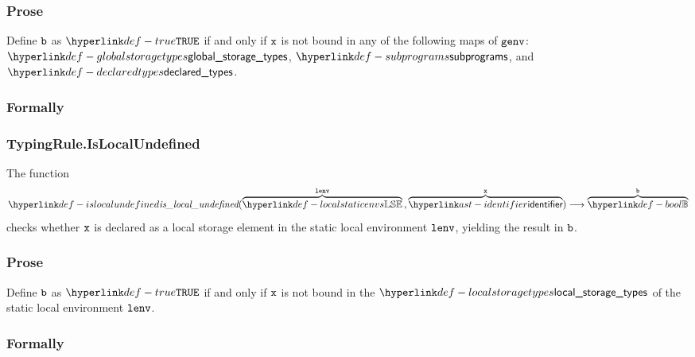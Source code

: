 \subsubsection{Prose}
Define $\vb$ as $\True$ if and only if $\vx$ is not bound in any of the following maps of $\genv$:
$\globalstoragetypes$, $\subprograms$, and $\declaredtypes$.
\subsubsection{Formally}
\begin{mathpar}
\end{mathpar}

\subsubsection{TypingRule.IsLocalUndefined\label{sec:TypingRule.IsLocalUndefined}}
\hypertarget{def-islocalundefined}{}
The function
\[
\islocalundefined(\overname{\localstaticenvs}{\lenv} \aslsep \overname{\identifier}{\vx}) \aslto \overname{\Bool}{\vb}
\]
checks whether $\vx$ is declared as a local storage element in the static local environment $\lenv$, yielding the result in $\vb$.

\subsubsection{Prose}
Define $\vb$ as $\True$ if and only if $\vx$ is not bound in the $\localstoragetypes$ of the static local environment $\lenv$.
\subsubsection{Formally}
\begin{mathpar}
\end{mathpar}

